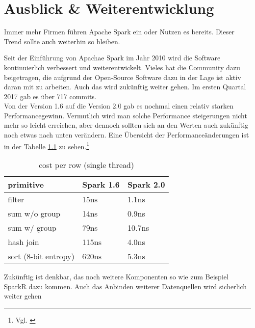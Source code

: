 \newpage
\chapter{Ausblick \& Weiterentwicklung} 

Immer mehr Firmen führen Apache Spark ein oder Nutzen es bereits. Dieser Trend sollte auch weiterhin so bleiben. 


\noindent
Seit der Einführung von Apachae Spark im Jahr 2010 wird die Software kontinuierlich verbessert und weiterentwickelt. Vieles hat die Community dazu beigetragen, die aufgrund der Open-Source Software dazu in der Lage ist aktiv daran mit zu arbeiten. Auch das wird zukünftig weiter gehen. Im ersten Quartal 2017 gab es über 717 commits.\\

\noindent
Von der Version 1.6 auf die Version 2.0 gab es nochmal einen relativ starken Performancegewinn. Vermutlich wird man solche Performance steigerungen nicht mehr so leicht erreichen, aber dennoch sollten sich an den Werten auch zukünftig noch etwas nach unten verändern. Eine Übersicht der Performanceänderungen ist in der Tabelle \ref{tab:spark_2_0} zu sehen.\footnote{Vgl. \cite{DATABRICK_SPARK_2_0}}


\begin{table}[h]
  \centering
		
		  \begin{tabular}[t]{|l|l|l|}
    \hline
		
		\rowcolor[gray]{.9}
		
				primitive	 & Spark 1.6 &  Spark 2.0 \\ \hline				
				filter &	15ns &	1.1ns \\ \hline				
				sum w/o group &	14ns &	0.9ns \\ \hline				
				sum w/ group &	79ns &	10.7ns \\ \hline				
				hash join	& 115ns	& 4.0ns \\ \hline				
				sort (8-bit entropy)	& 620ns	 & 5.3ns \\ \hline				

  \end{tabular}
		
  \caption{cost per row (single thread)}\label{tab:spark_2_0}
\end{table}



\noindent
Zukünftig ist denkbar, das noch weitere Komponenten so wie zum Beispiel SparkR dazu kommen. Auch das Anbinden weiterer Datenquellen wird sicherlich weiter gehen
